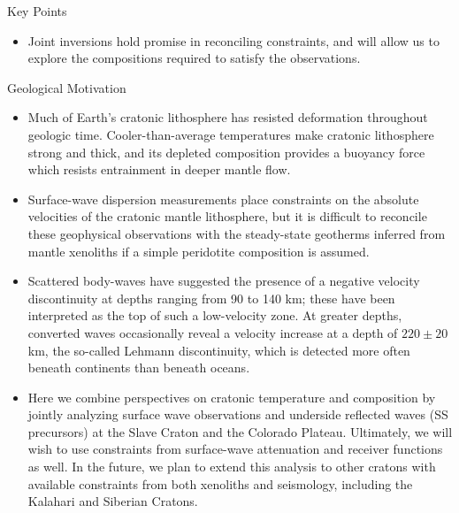 \documentclass[final]{beamer}
\newlength{\onecolwid}
\begin{document}
\begin{frame}[t]
\begin{columns}[t]
\begin{column}{\onecolwid}
\begin{alertblock}{Key Points}
\begin{itemize}
\begin{itemize}
\end{itemize}

\item Joint inversions hold promise in reconciling constraints, and will allow us to explore the compositions required to satisfy the observations.

\end{itemize}
\end{alertblock}


\begin{block}{Geological Motivation}

\begin{itemize}

\item Much of Earth's cratonic lithosphere has resisted deformation throughout geologic time.  Cooler-than-average temperatures make cratonic lithosphere strong and thick, and its depleted composition provides a buoyancy force which resists entrainment in deeper mantle flow.

\item Surface-wave dispersion measurements place constraints on the absolute velocities of the cratonic mantle lithosphere, but it is difficult to reconcile these geophysical observations with the steady-state geotherms inferred from mantle xenoliths if a simple peridotite composition is assumed.
 

\item Scattered body-waves have suggested the presence of a negative velocity discontinuity at depths ranging from 90 to 140 km; these have been interpreted as the top of such a low-velocity zone.  At greater depths, converted waves occasionally reveal a velocity increase at a depth of $220\pm20$ km, the so-called Lehmann discontinuity, which is detected more often beneath continents than beneath oceans.

\item Here we combine perspectives on cratonic temperature and composition by jointly analyzing surface wave observations and underside reflected waves (SS precursors) at the Slave Craton and the Colorado Plateau.  Ultimately, we will wish to use constraints from surface-wave attenuation and receiver functions as well.  In the future, we plan to extend this analysis to other cratons with available constraints from both xenoliths and seismology, including the Kalahari and Siberian Cratons.


\end{itemize}
\end{block}
\end{column}
\end{columns}
\end{frame}
\end{document}
